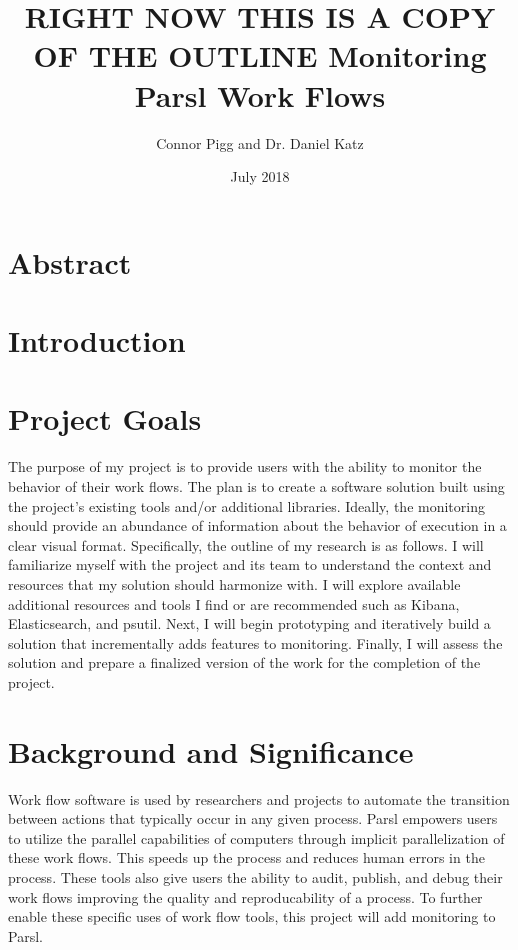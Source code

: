 \documentclass{article}
\title{\textbf{RIGHT NOW THIS IS A COPY OF THE OUTLINE}
Monitoring Parsl Work Flows}
\author{Connor Pigg and Dr. Daniel Katz}
\date{July 2018}
\begin{document}
\maketitle

\section{Abstract}

\pagebreak

\section{Introduction}


\section{Project Goals}
The purpose of my project is to provide users with the ability to monitor the behavior of their work flows.
The plan is to create a software solution built using the project's existing tools and/or additional libraries.
Ideally, the monitoring should provide an abundance of information about the behavior of execution in a clear visual format.
Specifically, the outline of my research is as follows.
I will familiarize myself with the project and its team to understand the context and resources that my solution should harmonize with.
I will explore available additional resources and tools I find or are recommended such as Kibana, Elasticsearch, and psutil.
Next, I will begin prototyping and iteratively build a solution that incrementally adds features to monitoring.
Finally, I will assess the solution and prepare a finalized version of the work for the completion of the project.

\section{Background and Significance}
Work flow software is used by researchers and projects to automate the transition between actions that typically occur in any given process.
Parsl empowers users to utilize the parallel capabilities of computers through implicit parallelization of these work flows.
This speeds up the process and reduces human errors in the process.
These tools also give users the ability to audit, publish, and debug their work flows improving the quality and reproducability of a process.
To further enable these specific uses of work flow tools, this project will add monitoring to Parsl.
\end{document}
